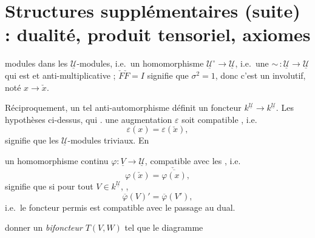 \documentclass[11pt,a4paper]{article}
\begin{document}
\section*{Structures supplémentaires (suite) : dualité, produit tensoriel, axiomes}



modules dans les $\underline{\mathcal{U}}$-modules, i.e.\ un
 homomorphisme
$\underline{\mathcal{U}}^{\circ} \to \underline{\mathcal{U}}$, i.e.\ une
 $\sim\,: \underline{\mathcal{U}} \to
\underline{\mathcal{U}}$ qui est \struck{\ill{}} \ill{} et anti-multiplicative ;
$\check{F}\check{F} = I$ signifie que $\sigma^2 = 1$, donc c'est un \ill{}
 involutif, noté $x \to \check{x}$.


Réciproquement, un tel anti-automorphisme définit \struck{\ill{}} un foncteur
$k^{\underline{\mathcal{U}}} \to k^{\underline{\mathcal{U}}}$. Les hypothèses
ci-dessus, qui \ill{} \ill{}.  une augmentation $\varepsilon$ \ill{} soit
\struck{\ill{}} compatible \ill{}, i.e.
\[ \varepsilon(x) = \varepsilon(\check{x}) , \]
signifie que  \ill{} les
$\underline{\mathcal{U}}$-modules triviaux. En  \ill{}

\ill{} un homomorphisme continu $\varphi : \underline{V} \to
\underline{\mathcal{U}}$, \ill{} compatible avec les \ill{}, \struck{\ill{}}
i.e.
\[ \varphi(\check{x}) = \check{\overline{\varphi(x)}} , \]
signifie que si  pour tout
$V \in k^{\underline{\mathcal{U}}}$, \ill{},
\[ \overline{\varphi}(V)' = \overline{\varphi}(V') , \]
i.e.\ le foncteur permis est compatible avec le passage au dual.


\ill{} donner un \emph{bifoncteur} $T(V,W)$ tel que le diagramme
\end{document}
